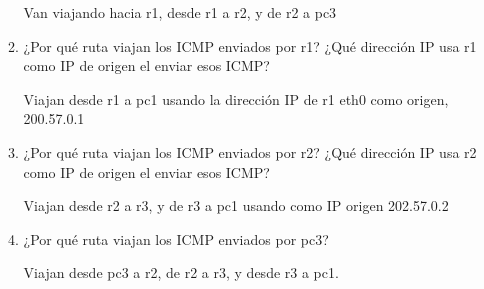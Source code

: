 \documentclass[12pt, a4paper]{report}
\begin{document}
\begin{enumerate}
\begin{enumerate}[label=\alph*]
		Van viajando hacia r1, desde r1 a r2, y de r2 a pc3
		\item ¿Por qué ruta viajan los ICMP enviados por
		r1?
		¿Qué dirección IP usa
		r1
		como IP de origen el enviar
		esos ICMP?
		
		Viajan desde r1 a pc1 usando la dirección IP de r1 eth0 como origen, 200.57.0.1
		\item ¿Por qué ruta viajan los ICMP enviados por
		r2?
		¿Qué dirección IP usa
		r2
		como IP de origen el enviar
		esos ICMP?
		
		Viajan desde r2 a r3, y de r3 a pc1 usando como IP origen 202.57.0.2
		\item ¿Por qué ruta viajan los ICMP enviados por
		pc3?
		
		Viajan desde pc3 a r2, de r2 a r3, y desde r3 a pc1.
		
	\end{enumerate}
\end{enumerate}
\end{document}
